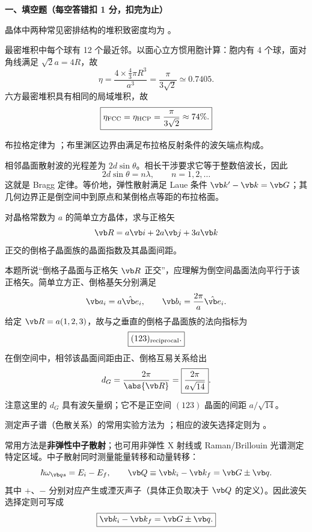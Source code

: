 
\textbf{一、填空题（每空答错扣 1 分，扣完为止）}

\begin{question}
晶体中两种常见密排结构的堆积致密度均为 \blank。


\begin{solution}
最密堆积中每个球有 12 个最近邻。以面心立方惯用胞计算：胞内有 4 个球，面对角线满足 $\sqrt2a=4R$，故
\[
 \eta=\frac{4\times\frac43\pi R^3}{a^3}
 =\frac{\pi}{3\sqrt2}\simeq0.7405.
\]
六方最密堆积具有相同的局域堆积，故
\[
 \boxed{\eta_{\rm FCC}=\eta_{\rm HCP}=\frac{\pi}{3\sqrt2}\approx74\%.}
\]
\end{solution}
\end{question}

\begin{question}
布拉格定律为 \blank；布里渊区边界由满足布拉格反射条件的波矢端点构成。


\begin{solution}
相邻晶面散射波的光程差为 $2d\sin\theta$。相长干涉要求它等于整数倍波长，因此
\[
 \boxed{2d\sin\theta=n\lambda,\qquad n=1,2,\ldots}
\]
这就是 Bragg 定律。等价地，弹性散射满足 Laue 条件
$\vb k'-\vb k=\vb G$；其几何边界正是倒空间中到原点和某倒格点等距的布拉格面。
\end{solution}
\end{question}

\begin{question}
对晶格常数为 $a$ 的简单立方晶体，求与正格矢
\[
  \vb R=a\vb i+2a\vb j+3a\vb k
\]
正交的倒格子晶面族的晶面指数及其晶面间距。


\begin{solution}
本题所说“倒格子晶面与正格矢 $\vb R$ 正交”，应理解为倒空间晶面法向平行于该正格矢。简单立方正、倒格基矢分别满足
\[
 \vb a_i=a\hat{\vb e}_i,
 \qquad \vb b_i=\frac{2\pi}{a}\hat{\vb e}_i.
\]
给定
$\vb R=a(1,2,3)$，故与之垂直的倒格子晶面族的法向指标为
\[
 \boxed{(123)_{\rm reciprocal}.}
\]
在倒空间中，相邻该晶面间距由正、倒格互易关系给出
\[
 d_G=\frac{2\pi}{\abs{\vb R}}
 =\boxed{\frac{2\pi}{a\sqrt{14}}}.
\]
注意这里的 $d_G$ 具有波矢量纲；它不是正空间 $(123)$ 晶面的间距 $a/\sqrt{14}$。
\end{solution}
\end{question}

\begin{question}
测定声子谱（色散关系）的常用实验方法为 \blank；相应的波矢选择定则为 \blank。


\begin{solution}
常用方法是\textbf{非弹性中子散射}；也可用非弹性 X 射线或 Raman/Brillouin 光谱测定特定区域。中子散射同时测量能量转移和动量转移：
\[
 \hbar\omega_{\vb q s}=E_i-E_f,
 \qquad
 \vb Q\equiv\vb k_i-\vb k_f=\vb G\pm\vb q.
\]
其中 $+$、$-$ 分别对应产生或湮灭声子（具体正负取决于 $\vb Q$ 的定义）。因此波矢选择定则可写成
\[
 \boxed{\vb k_i-\vb k_f=\vb G\pm\vb q.}
\]
\end{solution}
\end{question}


